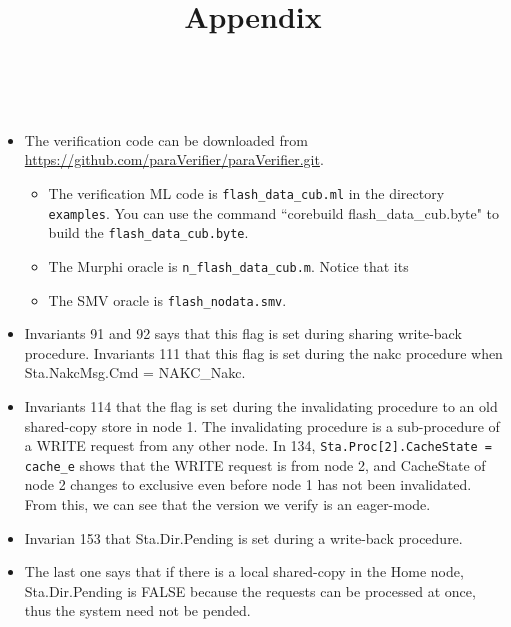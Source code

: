 \documentclass{llncs}
\begin{document}
\title{ Appendix }
\author{~}
\authorrunning{~}
\institute{~}

\maketitle
\begin{itemize}
 \item The verification code can be downloaded from \url{https://github.com/paraVerifier/paraVerifier.git}. 
   \begin{itemize} 
    \item The verification ML code is {\tt flash\_data\_cub.ml} in the directory {\tt examples}. You can use the command ``corebuild flash\_data\_cub.byte" to build the {\tt flash\_data\_cub.byte}.
     
     \item The Murphi oracle is {\tt n\_flash\_data\_cub.m}. Notice that its 
     \item The SMV oracle is {\tt flash\_nodata.smv}.

  \end{itemize}

  \item   Invariants 91 and 92 says that this flag is set during sharing write-back procedure. Invariants 111  that this flag is set during the nakc procedure when  Sta.NakcMsg.Cmd = NAKC\_Nakc.

   \item     Invariants 114 that the flag is set during the invalidating procedure to an old shared-copy store in node 1. The invalidating procedure is a sub-procedure  of a WRITE request from any other node. In 134, {\tt Sta.Proc[2].CacheState = cache\_e} shows that the WRITE request is from node 2, and CacheState of node 2 changes to exclusive even before node 1 has not been invalidated. From this, we can see that the version we verify is an eager-mode.

   \item       Invarian 153 that Sta.Dir.Pending is set during a write-back procedure.

  \item  The last one says that if there is a  local shared-copy in the Home node, Sta.Dir.Pending is FALSE because the   requests can be processed at once, thus the system need not be pended.
\end{itemize}





\end{document}

